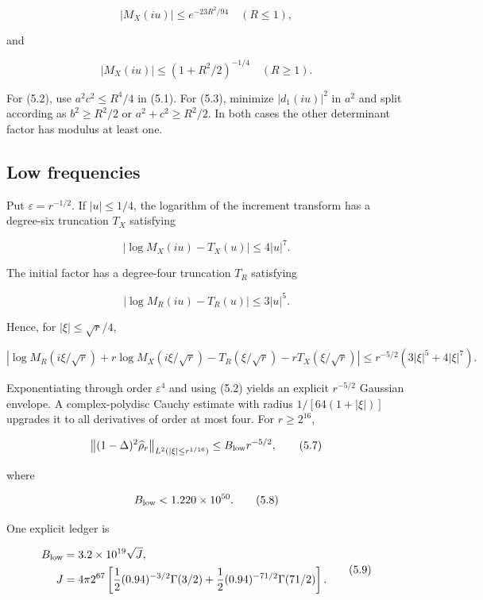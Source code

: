 \documentclass[11pt]{article}
\begin{document}
\[
|M_X(iu)|\le e^{-23R^2/94}\quad(R\le1),                 \tag{5.2}
\]

and

\[
|M_X(iu)|\le(1+R^2/2)^{-1/4}\quad(R\ge1).              \tag{5.3}
\]

For (5.2), use $a^2c^2\le R^4/4$ in (5.1).  For (5.3), minimize $|d_1(iu)|^2$ in $a^2$ and split according as $b^2\ge R^2/2$ or $a^2+c^2\ge R^2/2$.  In both cases the other determinant factor has modulus at least one.

\subsection{Low frequencies}

Put $\varepsilon=r^{-1/2}$.  If $|u|\le1/4$, the logarithm of the increment transform has a degree-six truncation $T_X$ satisfying

\[
|\log M_X(iu)-T_X(u)|\le4|u|^7.                         \tag{5.4}
\]

The initial factor has a degree-four truncation $T_R$ satisfying

\[
|\log M_R(iu)-T_R(u)|\le3|u|^5.                         \tag{5.5}
\]

Hence, for $|\xi|\le\sqrt r/4$,

\[
\left|\log M_R(i\xi/\sqrt r)+r\log M_X(i\xi/\sqrt r)
-T_R(\xi/\sqrt r)-rT_X(\xi/\sqrt r)\right|
\le r^{-5/2}(3|\xi|^5+4|\xi|^7).                      \tag{5.6}
\]

Exponentiating through order $\varepsilon^4$ and using (5.2) yields an explicit $r^{-5/2}$ Gaussian envelope.  A complex-polydisc Cauchy estimate with radius $1/[64(1+|\xi|)]$ upgrades it to all derivatives of order at most four.  For $r\ge2^{16}$,

\[
\left\|(1-\Delta)^2\widehat\rho_r\right\|_{L^2(
|\xi|\le r^{1/16})}
\le B_{\rm low}r^{-5/2},                                \tag{5.7}
\]

where

\[
B_{\rm low}<1.220\times10^{50}.                         \tag{5.8}
\]

One explicit ledger is

\[
\begin{aligned}
B_{\rm low}&=3.2\times10^{19}\sqrt J,\\
J&=4\pi2^{67}\left[\frac12(0.94)^{-3/2}\Gamma(3/2)
+\frac12(0.94)^{-71/2}\Gamma(71/2)\right].
\end{aligned}                                      \tag{5.9}
\]
\end{document}
